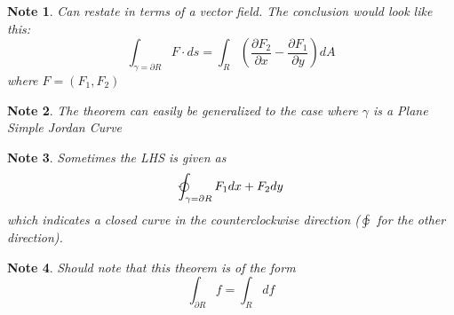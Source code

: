 \documentclass[12pt]{article}
\theoremstyle{plain}
\newtheorem*{note}{Note}
\theoremstyle{definition}
\begin{document}
	\begin{note}
		Can restate in terms of a vector field. The conclusion would look like this:
		$$\int_{\gamma = \partial R} F\cdot ds = \int_R (\frac{\partial F_2}{\partial x} - \frac{\partial F_1}{\partial y})dA$$ where $F = (F_1, F_2)$
	\end{note}

	\begin{note}
		The theorem can easily be generalized to the case where $\gamma$ is a Plane Simple Jordan Curve
	\end{note}

	\begin{note}
		Sometimes the LHS is given as $$\varointctrclockwise_{\gamma = \partial R} F_1 dx + F_2 dy$$ which indicates a closed curve in the counterclockwise direction  ($\varointclockwise$ for the other direction).
	\end{note}

	\begin{note}
		Should note that this theorem is of the form $$\int_{\partial R} f = \int_R df$$
	\end{note}
\end{document}

